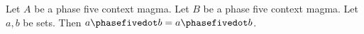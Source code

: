 

\begin{proposition}\label{phase5_contextual_receiver_ambiguous}
    Let $A$ be a phase five context magma.
    Let $B$ be a phase five context magma.
    Let $a,b$ be sets.
    Then $a\phasefivedot b=a\phasefivedot b$.
\end{proposition}
